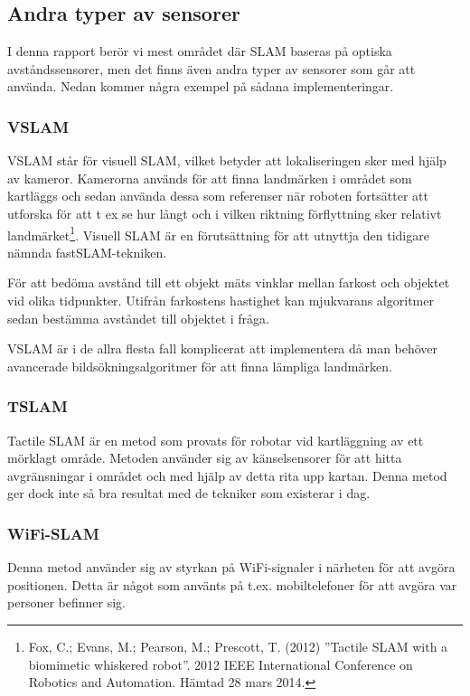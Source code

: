 \documentclass[a4paper,12pt,fleqn]{article}
\begin{document}
\subsection{Andra typer av sensorer}

I denna rapport berör vi mest området där SLAM baseras på optiska avståndssensorer, men det finns även andra typer av sensorer som går att använda. Nedan kommer några exempel på sådana implementeringar.

\subsubsection{VSLAM}

VSLAM står för visuell SLAM, vilket betyder att lokaliseringen sker med hjälp av kameror. Kamerorna används för att finna landmärken i området som kartläggs och sedan använda dessa som referenser när roboten fortsätter att utforska för att t ex se hur långt och i vilken riktning förflyttning sker relativt landmärket\footnote{Fox, C.; Evans, M.; Pearson, M.; Prescott, T. (2012) ''Tactile SLAM with a biomimetic whiskered robot''. 2012 IEEE International Conference on Robotics and Automation. Hämtad 28 mars 2014.}. Visuell SLAM är en förutsättning för att utnyttja den tidigare nämnda fastSLAM-tekniken. 

För att bedöma avstånd till ett objekt mäts vinklar mellan farkost och objektet vid olika tidpunkter. Utifrån farkostens hastighet kan mjukvarans algoritmer sedan bestämma avståndet till objektet i fråga. 

VSLAM är i de allra flesta fall komplicerat att implementera då man behöver avancerade bildsökningsalgoritmer för att finna lämpliga landmärken. 

\subsubsection{TSLAM}
Tactile SLAM är en metod som provats för robotar vid kartläggning av ett mörklagt område. Metoden använder sig av känselsensorer för att hitta avgränsningar i området och med hjälp av detta rita upp kartan. Denna metod ger dock inte så bra resultat med de tekniker som existerar i dag.

\subsubsection{WiFi-SLAM}
Denna metod använder sig av styrkan på WiFi-signaler i närheten för att avgöra positionen. Detta är något som använts på t.ex. mobiltelefoner för att avgöra var personer befinner sig. 
\end{document}
